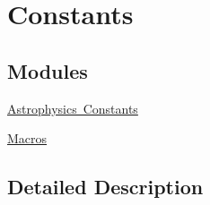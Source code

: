 \hypertarget{group___e_g_x_phys-_constants}{}\section{Constants}
\label{group___e_g_x_phys-_constants}
\subsection*{Modules}
\begin{DoxyCompactItemize}
\item 
\mbox{\hyperlink{group___e_g_x_phys-_constants-_astrophysics}{Astrophysics Constants}}
\item 
\mbox{\hyperlink{group___e_g_x_phys-_constants-_macros}{Macros}}
\end{DoxyCompactItemize}


\subsection{Detailed Description}
